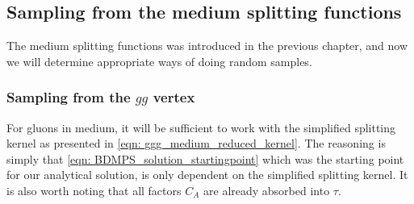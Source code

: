 \documentclass[main.tex]{subfiles}
\begin{document}
\subsection{Sampling from the medium splitting functions}
The medium splitting functions was introduced in the previous chapter, and now we will determine appropriate ways of doing random samples. 

\subsubsection*{Sampling from the \(gg\) vertex}
For gluons in medium, it will be sufficient to work with the simplified splitting kernel as presented in \autoref{eqn: ggg_medium_reduced_kernel}. The reasoning is simply that \autoref{eqn: BDMPS_solution_startingpoint} which was the starting point for our analytical solution, is only dependent on the simplified splitting kernel.
It is also worth noting that all factors \(C_A\) are already absorbed into \(\tau\).
\end{document}
